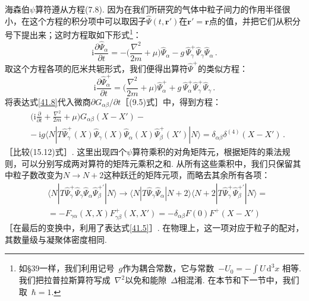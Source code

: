 海森伯$\psi$算符遵从方程(7.8). 因为在我们所研究的气体中粒子间力的作用半径很小，在这个方程的积分项中可以取因子$\hat\Psi(t,\bm r')$在$\bm r'=\bm r$点的值，并把它们从积分号下提出来；这时方程取如下形式\footnote{如§39一样，我们利用记号~$g$作为耦合常数，它与常数~$-U_0=-\int U\,\mathrm d^3x$ 相等. 我们把拉普拉斯算符写成~$\nabla^2$以免和能隙~$\Delta$相混淆. 在本节和下一节中，我们取~$\hbar=1$.}：
\begin{equation}
\mathrm i\frac{\partial\hat\Psi_\alpha}{\partial t}
= -\Biggl(\frac{\nabla^2}{2m}+\mu\Biggr)\hat\Psi_\alpha
- g\,\hat\Psi^{+}_\gamma\hat\Psi_\gamma\hat\Psi_\alpha\,.
\label{41.8}
\end{equation}
取这个方程各项的厄米共轭形式，我们便得出算符$\hat\Psi^{+}$的类似方程：
\begin{equation}
\mathrm i\frac{\partial\hat\Psi^{+}_\alpha}{\partial t}
= \Biggl(\frac{\nabla^2}{2m}+\mu\Biggr)\hat\Psi^{+}_\alpha
+ g\,\hat\Psi^{+}_\alpha\hat\Psi^{+}_\gamma\hat\Psi_\gamma\,.
\label{41.9}
\end{equation}
将表达式\eqref{41.8}代入微商$\partial G_{\alpha\beta}/\partial t$［(9.5)式］中，得到方程：
\begin{equation}
\begin{aligned}
&\Biggl(\mathrm i\frac{\partial}{\partial t}+\frac{\nabla^2}{2m}+\mu\Biggr)G_{\alpha\beta}(X-X') - {}\\
&-\ \mathrm ig\langle N|T\hat\Psi^{+}_\gamma(X)\hat\Psi_\gamma(X)\hat\Psi_\alpha(X)\hat\Psi^{+}_\beta(X')|N\rangle
= \delta_{\alpha\beta}\delta^{(4)}(X-X')\,.
\end{aligned}
\label{41.10}
\end{equation}
［比较(15.12)式］. 这里出现四个$\psi$算符乘积的对角矩阵元，根据矩阵的乘法规则，可以分别写成两对算符的矩阵元乘积之和. 从所有这些乘积中，我们只保留其中粒子数改变为$N\to N+2$这种跃迁的矩阵元项，而略去其余所有各项：
\begin{equation}
\begin{aligned}
&\langle N|T\hat\Psi^{+}_\gamma\hat\Psi_\gamma\hat\Psi_\alpha\hat\Psi^{+\prime}_\beta|N\rangle
\to \langle N|T\hat\Psi_\gamma\hat\Psi_\alpha|N+2\rangle
\langle N+2|T\hat\Psi^{+}_\gamma\hat\Psi^{+\prime}_\beta|N\rangle = {}\\
&= -F_{\gamma\alpha}(X,X)F^{+}_{\gamma\beta}(X,X') = -\delta_{\alpha\beta}F(0)F^{+}(X-X')
\end{aligned}
\label{41.11}
\end{equation}
［在最后的变换中，利用了表达式\eqref{41.5}］. 在物理上，这一项对应于粒子的配对，其数量级与凝聚体密度相同.

